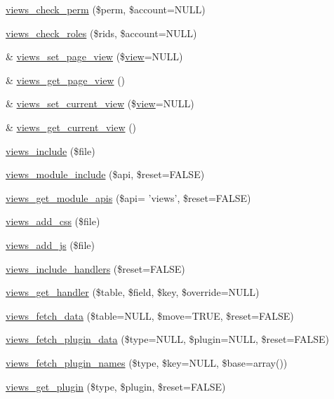 \begin{DoxyCompactItemize}
\hyperlink{views_8module_aa76091b45e7d90275a77906611361832}{views\_\-check\_\-perm} (\$perm, \$account=NULL)
\item 
\hyperlink{views_8module_aff4ad7e99455055e33d13bc6394bea69}{views\_\-check\_\-roles} (\$rids, \$account=NULL)
\item 
\& \hyperlink{views_8module_a71f9684b8a0e7aae0871333881fc06c7}{views\_\-set\_\-page\_\-view} (\$\hyperlink{classview}{view}=NULL)
\item 
\& \hyperlink{views_8module_a6f9bd3baa42d847c9ea9dee1d0372db8}{views\_\-get\_\-page\_\-view} ()
\item 
\& \hyperlink{views_8module_af6970f0a92406ed61373aa9ede6b121e}{views\_\-set\_\-current\_\-view} (\$\hyperlink{classview}{view}=NULL)
\item 
\& \hyperlink{views_8module_a3e0de34df0a9358f06a0bc139250ac47}{views\_\-get\_\-current\_\-view} ()
\item 
\hyperlink{views_8module_ad842e97fb86ddbcdb0c35b42bae9abba}{views\_\-include} (\$file)
\item 
\hyperlink{views_8module_a22df4c2332b9999ad29f8e2771cf63b1}{views\_\-module\_\-include} (\$api, \$reset=FALSE)
\item 
\hyperlink{views_8module_a1da818e38d5362aa5474ed84c833cfc6}{views\_\-get\_\-module\_\-apis} (\$api= 'views', \$reset=FALSE)
\item 
\hyperlink{views_8module_ae236596838c24ca0d9639b523e397cd4}{views\_\-add\_\-css} (\$file)
\item 
\hyperlink{views_8module_a46f0b0606a74393adc87edd14044edbe}{views\_\-add\_\-js} (\$file)
\item 
\hyperlink{views_8module_a3369e9cb08a242a97093d79ed688653c}{views\_\-include\_\-handlers} (\$reset=FALSE)
\item 
\hyperlink{views_8module_a01ad2babd9f3cc6cc40e092a12267158}{views\_\-get\_\-handler} (\$table, \$field, \$key, \$override=NULL)
\item 
\hyperlink{views_8module_ae5d88e70640d423f3faed5c7bb6af672}{views\_\-fetch\_\-data} (\$table=NULL, \$move=TRUE, \$reset=FALSE)
\item 
\hyperlink{views_8module_ae97ae3a47ea45a0d7d39a52286e6fab2}{views\_\-fetch\_\-plugin\_\-data} (\$type=NULL, \$plugin=NULL, \$reset=FALSE)
\item 
\hyperlink{views_8module_ae7963b102753500f8de139bf60d59ca5}{views\_\-fetch\_\-plugin\_\-names} (\$type, \$key=NULL, \$base=array())
\item 
\hyperlink{views_8module_a6989c2c815b1afa01fa3f29841497ba1}{views\_\-get\_\-plugin} (\$type, \$plugin, \$reset=FALSE)

\end{DoxyCompactItemize}
